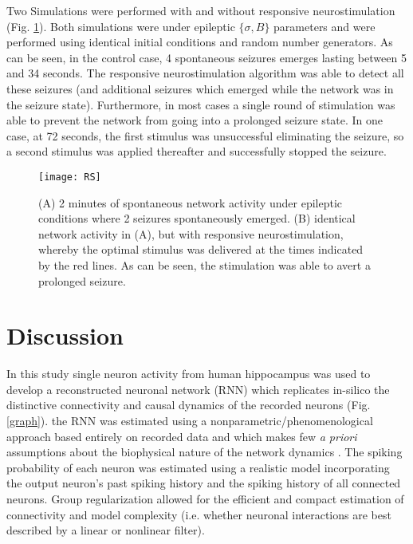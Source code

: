 \documentclass[11pt,a4paper,final]{article}
\begin{document}
Two Simulations were performed with and without responsive neurostimulation (Fig. \ref{RS}).
Both simulations were under epileptic $\{\sigma,B\}$ parameters and were performed using identical initial conditions and random number generators.
As can be seen, in the control case, 4 spontaneous seizures emerges lasting between 5 and 34 seconds.
The responsive neurostimulation algorithm was able to detect all these seizures (and additional seizures which emerged while the network was in the seizure state).
Furthermore, in most cases a single round of stimulation was able to prevent the network from going into a prolonged seizure state.
In one case, at 72 seconds, the first stimulus was unsuccessful eliminating the seizure, so a second stimulus was applied thereafter and successfully stopped the seizure.

\begin{figure}[!ht]
\centering
\texttt{[image: RS]}
\caption[Responsive Stimulation]{
(A) 2 minutes of spontaneous network activity under epileptic conditions where 2 seizures spontaneously emerged.
(B) identical network activity in (A), but with responsive neurostimulation, whereby the optimal \len{} stimulus was delivered at the times indicated by the red lines. As can be seen, the stimulation was able to avert a prolonged seizure.}
\label{RS}
\end{figure}

\section{Discussion \label{disc}}

In this study single neuron activity from human hippocampus was used to develop a reconstructed neuronal network (RNN) which replicates in-silico the distinctive connectivity and causal dynamics of the recorded \nn{} neurons (Fig. \ref{graph}).
the RNN was estimated using a nonparametric/phenomenological approach based entirely on recorded data and which makes few \textit{a priori} assumptions about the biophysical nature of the network dynamics \citep{pillow08}.
The spiking probability of each neuron was estimated using a realistic model incorporating the output neuron's past spiking history and the spiking history of all connected neurons.
Group regularization allowed for the efficient and compact estimation of connectivity and model complexity (i.e. whether neuronal interactions are best described by a linear or nonlinear filter).
\end{document}
